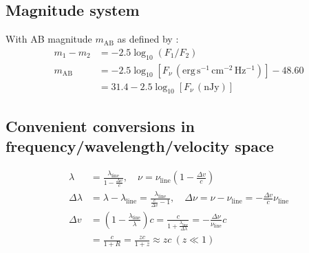 \documentclass{article}
\theoremstyle{definition}
\begin{document}
\subsection{Magnitude system}
\label{app:Magnitude_system}

With AB magnitude $m_\text{AB}$ as defined by \citep{1983ApJ...266..713O}:
\begin{align*}
    m_1 - m_2 & = -2.5 \log_{10} \left( F_1 / F_2 \right)
    \\
    m_\text{AB} & = -2.5 \log_{10} \left[ F_\nu \, (\mathrm{erg \, s^{-1} \, cm^{-2} \, Hz^{-1}}) \right] - 48.60
    \\
    & = 31.4 - 2.5 \log_{10} \left[ F_\nu \, (\mathrm{nJy}) \right]
\end{align*}

\subsection{Convenient conversions in frequency/wavelength/velocity space}
\label{app:Frequency_wavelength_velocity_conversions}

\begin{align*}
    \lambda & = \frac{\lambda_\mathrm{line}}{1 - \frac{\Delta v}{c}}, \quad \nu = \nu_\mathrm{line} \left( 1 - \frac{\Delta v}{c} \right)
    \\
    \Delta \lambda & = \lambda - \lambda_\mathrm{line} = \frac{\lambda_\mathrm{line}}{\frac{c}{\Delta v} - 1}, \quad \Delta \nu = \nu - \nu_\mathrm{line} = - \frac{\Delta v}{c} \nu_\mathrm{line}
    \\
    \Delta v & = \left( 1 - \frac{\lambda_\mathrm{line}}{\lambda} \right) c = \frac{c}{1 + \frac{\lambda_\mathrm{line}}{\Delta \lambda}} = - \frac{\Delta \nu}{\nu_\mathrm{line}} c
    \\
    & = \frac{c}{1 + R} = \frac{zc}{1+z} \approx z c \: (z \ll 1)
\end{align*}
\end{document}
